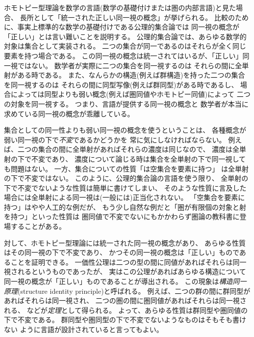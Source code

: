 \documentclass[index]{subfiles}
\begin{document}

ホモトピー型理論を数学の言語(数学の基礎付けまたは圏の内部言語)と見た場合、
長所として「統一された正しい同一視の概念」が挙げられる。
比較のために、事実上標準的な数学の基礎付けである公理的集合論では
同一視の概念が「正しい」とは言い難いことを説明する。
公理的集合論では、あらゆる数学的対象は集合として実装される。
二つの集合が同一であるのはそれらが全く同じ要素を持つ場合である。
この同一視の概念は統一されてはいるが、「正しい」同一視ではない。
数学者が実際に二つの集合を同一視するのは
それらの間に全単射がある時である。
また、なんらかの構造(例えば群構造)を持った二つの集合を同一視するのは
それらの間に同型写像(例えば群同型)がある時であるし、
場合によっては同型よりも弱い概念(例えば圏同値やホモトピー同値)によって
二つの対象を同一視する。
つまり、言語が提供する同一視の概念と
数学者が本当に求めている同一視の概念が乖離している。

集合としての同一性よりも弱い同一視の概念を使うということは、
各種概念が弱い同一視の下で\emph{不変}であるかどうかを
常に気にしなければならない。
例えば、二つの集合の間に全単射があればそれらの濃度は同じなので、
濃度は全単射の下で不変であり、
濃度について論じる時は集合を全単射の下で同一視しても問題はない。
一方、集合についての性質「は空集合を要素に持つ」
は全単射の下で不変ではない。
このように、公理的集合論の言語を使う限り、
全単射の下で不変でないような性質は簡単に書けてしまい、
そのような性質に言及した場合には全単射による同一視は(一般には)正当化されない。
「空集合を要素に持つ」はやや人工的な例だが、
もう少し自然な例だと「圏が有限個の対象と射を持つ」といった性質は
圏同値で不変でないにもかかわらず圏論の教科書に登場することがある。

対して、ホモトピー型理論には統一された同一視の概念があり、
あらゆる性質はその同一視の下で不変であり、
かつその同一視の概念は「正しい」ものであることを証明できる。
一価性公理は二つの型の間に同値があればそれらは同一視されるというものであったが、
実はこの公理があればあらゆる構造について同一視の概念が「正しい」ものであることが導出される。
この現象は\emph{構造同一原理}(structure identity principle)と呼ばれる。
例えば、二つの群の間に群同型があればそれらは同一視され、
二つの圏の間に圏同値があればそれらは同一視される、
などが\emph{定理}として得られる。
よって、あらゆる性質は群同型や圏同値の下で不変である。
群同型や圏同型の下で不変でないようなものはそもそも書けない
ように言語が設計されていると言ってもよい。
\end{document}

